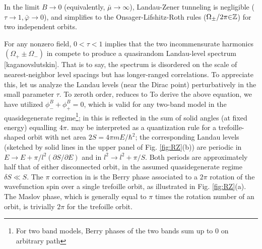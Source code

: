\documentclass[aps, prb, showpacs, twocolumn, notitlepage, superscriptaddress]{revtex4-1}
\begin{document}
In the limit $B{\rightarrow}0$ (equivalently, $\bar{\mu}{\rightarrow} \infty$), Landau-Zener tunneling is negligible ($\tau{\rightarrow}1,\bar{\varphi}{\rightarrow}0$), and  simplifies to the Onsager-Lifshitz-Roth rules ($\Omega_{\pm}/2\pi{\in}\mathbb{Z}$) for  two independent orbits.

For any nonzero field, $0{<}\tau{<}1$ implies that the two incommensurate harmonics $(\Omega_+{\pm}\Omega_-)$ in  compete to produce a quasirandom Landau-level spectrum [kaganovslutskin]. That is to say, the spectrum is disordered on the scale of nearest-neighbor level spacings but has longer-ranged correlations. To appreciate this, let us analyze the Landau levels (near the Dirac point) perturbatively in the small parameter $\tau$. To zeroth order,  reduces to
To derive the above equation, we have utilized $\phi^B_-{+}\phi^B_+{=}0$, which is valid for any two-band model in the quasidegenerate regime\footnote{For two band models, Berry phases of the two bands sum up to 0 on arbitrary path}; in  this is reflected in the sum of solid angles (at fixed energy) equalling $4\pi$.  may be interpreted as a quantization rule for a trefoille-shaped orbit with net area $2S{=}4\pi m E{/\hbar^2}$; the corresponding Landau levels (sketched by solid lines in the upper panel of Fig. \ref{fig:RZ}(b)) are periodic in $E{\rightarrow}E{+}\pi/l^2(\partial S/\partial E)$ and in $l^2{\rightarrow}l^2{+}\pi/S$. Both periods are approximately half that of either disconnected  orbit, in the assumed quasidegenerate regime $\delta S{\ll}S$. The $\pi$ correction in  is the Berry phase associated to a $2\pi$ rotation of the wavefunction spin over a single trefoille orbit, as illustrated in Fig. \ref{fig:RZ}(a). The Maslov phase, which is generally equal to $\pi$ times the rotation number of an orbit, is trivially $2\pi$ for the trefoille orbit.
\end{document}

